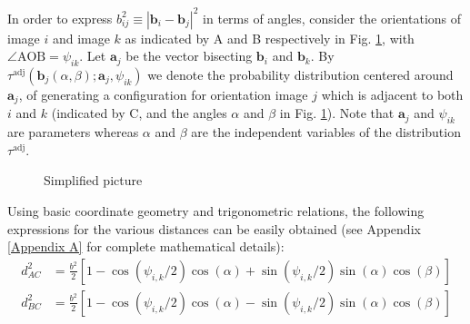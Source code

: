 In order to express $b^2_{ij} \equiv |{\mathbf b}_i - {\mathbf b}_{j}|^2$ in terms of angles, consider the orientations of image $i$ and image $k$ as indicated by A and B respectively in Fig. \ref{fig:simple}, with $\angle \text{AOB} = \psi_{ik}$. Let ${\mathbf a}_j$ be the vector bisecting ${\mathbf b}_i$ and  ${\mathbf b}_k$. By $\tau^\text{adj} \left( {\mathbf b}_j (\alpha, \beta); \mathbf{a}_j, \psi_{ik} \right)$ we denote the probability distribution centered around ${\mathbf a}_j$, of generating a configuration for orientation image $j$ which is adjacent to both $i$ and $k$ (indicated by C, and the angles $\alpha$ and $\beta$ in Fig. \ref{fig:simple}). Note that $\mathbf{a}_j$ and $\psi_{ik}$ are parameters whereas $\alpha$ and $\beta$ are the independent variables of the distribution $\tau^\text{adj}$.
            \begin{figure}[!htbp]
                \centering
                \def\svgwidth{0.25\columnwidth}
                
                \caption{Simplified picture}
                \label{fig:simple}
            \end{figure}
            Using basic coordinate geometry and trigonometric relations, the following expressions for the various distances can be easily obtained (see Appendix \ref{Appendix A} for complete mathematical details):
            \begin{equation}
            \label{eq:deltax}
                \begin{aligned}
                    d_{AC}^2 &= \frac{b^2}{2} [1 - \cos(\psi_{i,k}/2) \cos(\alpha) + \sin(\psi_{i,k}/2) \sin(\alpha) \cos(\beta)]\\
                    d_{BC}^2 &= \frac{b^2}{2} [1 - \cos(\psi_{i,k}/2) \cos(\alpha) - \sin(\psi_{i,k}/2) \sin(\alpha) \cos(\beta)]
                \end{aligned}
            \end{equation}

